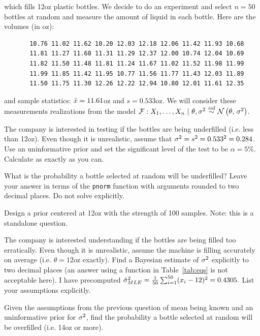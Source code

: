 \documentclass[12pt]{article}
\begin{document}
\noindent which fills 12oz plastic bottles. We decide to do an experiment and select $n = 50$ bottles at random and measure the amount of liquid in each bottle. Here are the volumes (in oz):

\begin{verbatim}
       10.76 11.02 11.62 10.20 12.03 12.18 12.06 11.42 11.93 10.68
       11.81 11.27 11.68 11.31 11.29 12.37 12.00 10.74 12.04 10.69
       11.82 11.50 11.48 11.81 11.24 11.67 11.02 11.52 11.98 11.99
       11.99 11.85 11.42 11.95 10.77 11.56 11.77 11.43 12.03 11.89
       11.50 11.75 11.30 12.26 12.22 12.94 10.80 12.01 11.61 12.35
\end{verbatim}

\noindent and sample statistics: $\bar{x} = 11.61$oz and $s = 0.533$oz. We will consider these measurements realizations from the model $\mathcal{F} : \Xoneton~|~\theta, \sigsq \iid \normnot{\theta}{\sigsq}$.
\benum


 The company is interested in testing if the bottles are being underfilled (i.e. less than 12oz). Even though it is unrealistic, assume that $\sigma^2 = s^2 = 0.533^2 = 0.284$. Use an uninformative prior and set the significant level of the test to be $\alpha = 5\%$. Calculate as exactly as you can.

 What is the probability a bottle selected at random will be underfilled? Leave your answer in terms of the \texttt{pnorm} function with arguments rounded to two decimal places. Do not solve explicitly.


 Design a prior centered at 12oz with the strength of 100 samples. Note: this is a standalone question.


 The company is interested understanding if the bottles are being filled too erratically. Even though it is unrealistic, assume the machine is filling accurately on average (i.e. $\theta  =12$oz exactly). Find a Bayesian estimate of $\sigma^2$ explicitly to two decimal places (an answer using a function in Table~\ref{tab:eqs} is not acceptable here). I have precomputed $\hat{\sigma}^2_{MLE} = \frac{1}{50} \sum_{i=1}^{50} (x_i - 12)^2 = 0.4305.$ List your assumptions explicitly. 

 Given the assumptions from the previous question of mean being known and an uninformative prior for $\sigma^2$, find the probability a bottle selected at random will be overfilled (i.e. 14oz or more).
\end{document}
